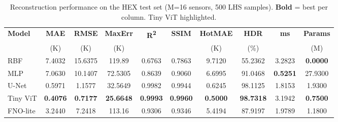 \begin{table}[h]
\centering
\caption{Reconstruction performance on the HEX test set (M=16 sensors, 500 LHS samples).
\textbf{Bold} = best per column. Tiny ViT highlighted.}
\label{tab:main}
\begin{tabular}{lccccccccc}
\hline
\textbf{Model} & \textbf{MAE} & \textbf{RMSE} & \textbf{MaxErr} & \textbf{R\textsuperscript{2}} & \textbf{SSIM} & \textbf{HotMAE} & \textbf{HDR} & \textbf{ms} & \textbf{Params} \\
& (K) & (K) & (K) & & & (K) & (\%) & & (M) \\
\hline
RBF & 7.4032 & 15.6375 & 119.89 & 0.6763 & 0.7863 & 9.7120 & 55.2362 & 3.2823 & \textbf{0.0000} \\
MLP & 7.0630 & 10.1407 & 72.5305 & 0.8639 & 0.9060 & 6.6995 & 91.0468 & \textbf{0.5251} & 27.9300 \\
U-Net & 0.5971 & 1.1577 & 32.5649 & 0.9982 & 0.9944 & 0.6245 & 98.1125 & 1.8153 & 1.9300 \\
\rowcolor{gray!15}Tiny ViT & \textbf{0.4076} & \textbf{0.7177} & \textbf{25.6648} & \textbf{0.9993} & \textbf{0.9960} & \textbf{0.5000} & \textbf{98.7318} & 3.1942 & \textbf{0.7500} \\
FNO-lite & 3.2440 & 7.2418 & 113.16 & 0.9306 & 0.9346 & 5.4194 & 87.9197 & 1.9789 & 1.1800 \\
\hline
\end{tabular}
\end{table}